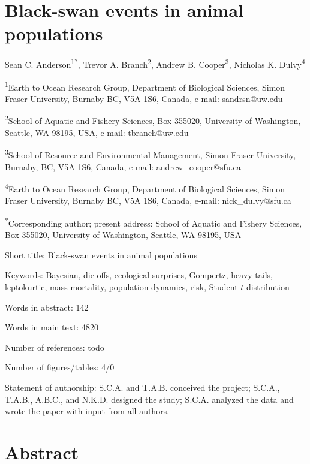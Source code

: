 \section{Black-swan events in animal populations}

Sean C. Anderson\textsuperscript{1*}, Trevor A.
Branch\textsuperscript{2}, Andrew B. Cooper\textsuperscript{3}, Nicholas K.
Dulvy\textsuperscript{4}

\textsuperscript{1}Earth to Ocean Research Group, Department of Biological
Sciences, Simon Fraser University, Burnaby BC, V5A 1S6, Canada, e-mail:
sandrsn@uw.edu

\textsuperscript{2}School of Aquatic and Fishery Sciences, Box 355020,
University of Washington, Seattle, WA 98195, USA, e-mail:
tbranch@uw.edu

\textsuperscript{3}School of Resource and Environmental Management, Simon
Fraser University, Burnaby, BC, V5A 1S6, Canada, e-mail:
andrew\_cooper@sfu.ca

\textsuperscript{4}Earth to Ocean Research Group, Department of Biological
Sciences, Simon Fraser University, Burnaby BC, V5A 1S6, Canada, e-mail:
nick\_dulvy@sfu.ca

\textsuperscript{*}Corresponding author; present address:
School of Aquatic and Fishery Sciences, Box
355020, University of Washington, Seattle, WA 98195, USA

Short title: Black-swan events in animal populations

Keywords:
Bayesian,
die-offs,
ecological surprises,
Gompertz,
heavy tails,
leptokurtic,
mass mortality,
population dynamics,
risk,
Student-$t$ distribution

Words in abstract: 142

Words in main text: 4820

Number of references: todo

Number of figures/tables: 4/0

Statement of authorship:
S.C.A. and T.A.B. conceived the project;
S.C.A., T.A.B., A.B.C., and N.K.D. designed the study; S.C.A. analyzed the
data and wrote the paper with input from all authors.

\newpage

\section{Abstract}

